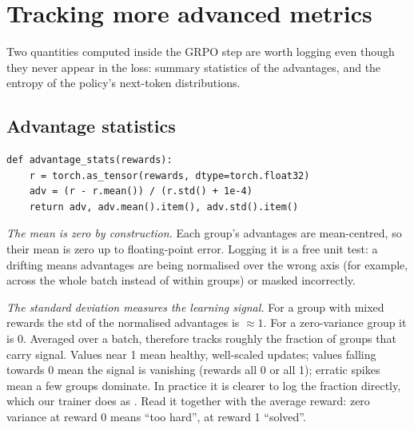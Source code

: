 \section{Tracking more advanced metrics}\label{sec:grpo2:advanced}

Two quantities computed inside the GRPO step are worth logging even though they never
appear in the loss: summary statistics of the advantages, and the entropy of the policy's
next-token distributions.

\subsection{Advantage statistics}\label{sec:grpo2:advstats}

\begin{lstlisting}[caption={Advantage statistics.},label={lst:grpo2:advstats}]
def advantage_stats(rewards):
    r = torch.as_tensor(rewards, dtype=torch.float32)
    adv = (r - r.mean()) / (r.std() + 1e-4)
    return adv, adv.mean().item(), adv.std().item()
\end{lstlisting}

\emph{The mean is zero by construction.} Each group's advantages are mean-centred, so their
mean is zero up to floating-point error. Logging it is a free unit test: a drifting
 means advantages are being normalised over the wrong axis (for example,
across the whole batch instead of within groups) or masked incorrectly.

\emph{The standard deviation measures the learning signal.} For a group with mixed rewards
the std of the normalised advantages is $\approx1$. For a zero-variance group it is 0.
Averaged over a batch,  therefore tracks roughly the fraction of groups that
carry signal. Values near 1 mean healthy, well-scaled updates; values falling towards 0 mean
the signal is vanishing (rewards all 0 or all 1); erratic spikes mean a few groups dominate.
In practice it is clearer to log the fraction directly, which our trainer does as
. Read it together with the average reward: zero variance at reward 0
means ``too hard'', at reward 1 ``solved''.

